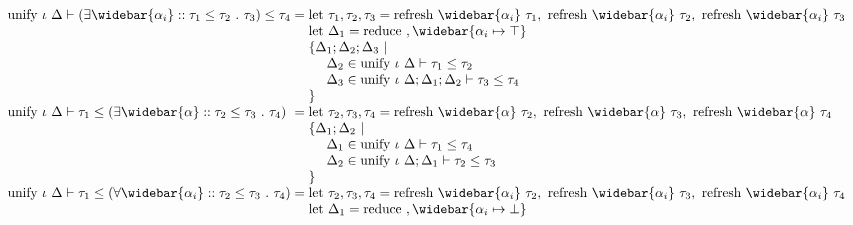 \documentclass[sigplan,screen]{acmart}
\begin{document}
\begin{figure*}[h]
\[\begin{array}{l @{} l}
      \text{unify } \iota\ \Delta \vdash
      (\exists \widebar{\alpha_i} :: \tau_1 \leq \tau_2\ .\ \tau_3)
      \leq 
      \tau_4
      &{} = 
      \begin{array}[t]{@{} l}
        \text{let } \tau_1, \tau_2, \tau_3 = 
        \text{refresh } \widebar{\alpha_i}\ \tau_1,\ 
        \text{refresh } \widebar{\alpha_i}\ \tau_2,\ 
        \text{refresh } \widebar{\alpha_i}\ \tau_3
        \\
        \text{let } \Delta_1 = \text{reduce}\ , \widebar{\alpha_i \mapsto \top}
        \\
        \{\Delta_1;\Delta_2;\Delta_3\ |
        \\ 
        \ \ \ \ \Delta_2 \in \text{unify } \iota\ \Delta \vdash \tau_1 \leq \tau_2
        \\
        \ \ \ \ \Delta_3 \in \text{unify } \iota\ \Delta;\Delta_1;\Delta_2 \vdash \tau_3 \leq \tau_4
        \\
        \}
      \end{array}
      \\
      \text{unify } \iota\ \Delta \vdash
      \tau_1
      \leq 
      (\exists \widebar{\alpha} :: \tau_2 \leq \tau_3\ .\ \tau_4)
      &{} = 
      \begin{array}[t]{@{} l}
        \text{let } \tau_2, \tau_3, \tau_4 = 
        \text{refresh } \widebar{\alpha}\ \tau_2,\ 
        \text{refresh } \widebar{\alpha}\ \tau_3,\ 
        \text{refresh } \widebar{\alpha}\ \tau_4
        \\
        \{\Delta_1;\Delta_2\ |
        \\ 
        \ \ \ \ \Delta_1 \in \text{unify } \iota\ \Delta \vdash \tau_1 \leq \tau_4
        \\
        \ \ \ \ \Delta_2 \in \text{unify } \iota\ \Delta;\Delta_1 \vdash \tau_2 \leq \tau_3
        \\
        \}
      \end{array}
      \\
      \text{unify } \iota\ \Delta \vdash
      \tau_1
      \leq 
      (\forall \widebar{\alpha_i} :: \tau_2 \leq \tau_3\ .\ \tau_4)
      &{} = 
      \begin{array}[t]{@{} l}
        \text{let } \tau_2, \tau_3, \tau_4 = 
        \text{refresh } \widebar{\alpha_i}\ \tau_2,\ 
        \text{refresh } \widebar{\alpha_i}\ \tau_3,\ 
        \text{refresh } \widebar{\alpha_i}\ \tau_4
        \\
        \text{let } \Delta_1 = \text{reduce}\ , \widebar{\alpha_i \mapsto \bot}
        \\

\end{array}
\end{array}\]
\end{figure*}
\end{document}
